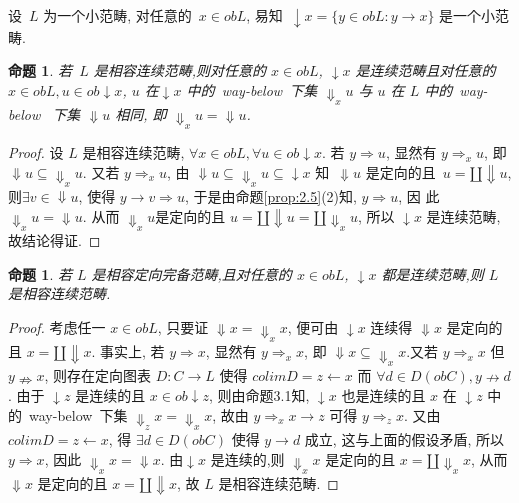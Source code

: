 \documentclass[c5size,a4paper,hyperref,fancyhdr,UTF8]{ctexart}
\theoremstyle{nonumberplain}
\newtheorem{proof}{证明}
\newtheorem{proposition}[definition]{命题}
\theoremstyle{nonumberplain}
\newtheorem{proof}{证}
\begin{document}
设~$L$ 为一个小范畴, 对任意的~$x\in obL$, 易知~$\downarrow x=\{y\in obL:y\rightarrow x\}$ 是一个小范畴.

\begin{proposition}\label{prop:3.1}
  若~$L$ 是相容连续范畴,则对任意的 $x\in obL$, $\downarrow x$ 是连续范畴且对任意的 $x\in obL, u\in ob\downarrow x$, $u$ 在$\downarrow x$ 中的~way-below~下集 $\Downarrow_{x}u$ 与 $u$ 在 $L$ 中的~way-below~ 下集 $\Downarrow u$ 相同, 即 $\Downarrow_{x}u=\Downarrow u$.
\end{proposition}

\begin{proof}\label{prop:3.2}
  设 $L$ 是相容连续范畴, $\forall x\in obL, \forall u\in ob\downarrow x$. 若 $y\Rightarrow u$, 显然有   $y\Rightarrow_{x} u$, 即 $\Downarrow u\subseteq\Downarrow_{x}u$. 又若 $y\Rightarrow_{x}u$, 由 $\Downarrow u\subseteq\Downarrow_{x}u\subseteq\downarrow x$ 知~$\Downarrow u$ 是定向的且~$u=\amalg\Downarrow u$, 则$\exists v\in\Downarrow u$, 使得 $y\rightarrow v\Rightarrow u$, 于是由命题\ref{prop:2.5}(2)知, $y\Rightarrow u$, 因 此 $\Downarrow_{x}u=\Downarrow u$. 从而 $\Downarrow_{x}u$是定向的且 $u=\amalg\Downarrow u=\amalg\Downarrow_{x}u$, 所以 $\downarrow x$ 是连续范畴,故结论得证.
\end{proof}

\begin{proposition}
  若 $L$ 是相容定向完备范畴,且对任意的 $x\in obL$, $\downarrow x$ 都是连续范畴,则 $L$ 是相容连续范畴.
\end{proposition}

\begin{proof}
    考虑任一 $x\in obL$, 只要证 $\Downarrow x=\Downarrow_{x}x$, 便可由 $\downarrow x$ 连续得
    $\Downarrow x$ 是定向的且 $x=\amalg\Downarrow x$. 事实上, 若 $y\Rightarrow x$, 显然有 $y\Rightarrow_{x}x$,
    即 $\Downarrow x\subseteq\Downarrow_{x}x$.又若 $y\Rightarrow_{x}x$ 但 $y\nRightarrow x$,
    则存在定向图表 $D:C\rightarrow L$ 使得 $colim D=z\leftarrow x$ 而 $\forall d\in D(obC), y\nrightarrow d$.
    由于 $\downarrow z$ 是连续的且 $x\in ob\downarrow z$, 则由命题3.1知, $\downarrow x$ 也是连续的且 $x$ 在 $\downarrow z$
    中的~way-below~下集 $\Downarrow_{z}x=\Downarrow_{x}x$, 故由 $y\Rightarrow_{x}x\rightarrow z$ 可得 $y\Rightarrow_{z}x$.
    又由 $colim D=z\leftarrow x$, 得 $\exists d\in D(obC)$ 使得 $y\rightarrow d$ 成立, 这与上面的假设矛盾, 所以 $y\Rightarrow x$,
    因此 $\Downarrow_{x}x=\Downarrow x$. 由$\downarrow x$ 是连续的,则 $\Downarrow_{x}x$ 是定向的且 $x=\amalg\Downarrow_{x}x$,
    从而 $\Downarrow x$ 是定向的且 $x=\amalg\Downarrow x$, 故 $L$ 是相容连续范畴.
\end{proof}
\end{document}
